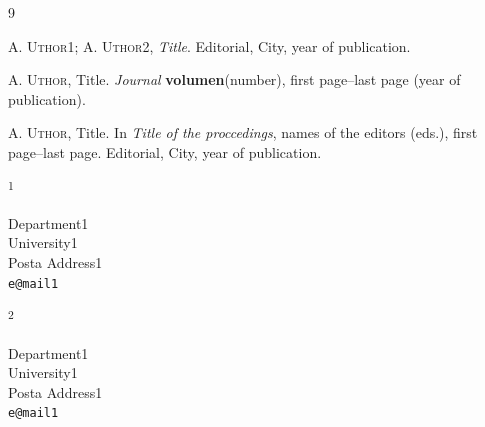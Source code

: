 \documentclass{article}
\newcommand{\ADDRESS}[2]{\noindent
  \textsuperscript{#1}\parbox[t]{0.9\textwidth}{#2} \vspace{6pt}}
\begin{document}

\begin{thebibliography}{9}

   \textsc{A. Uthor1; A. Uthor2}, \emph{Title}.
    Editorial, City, year of publication.

   \textsc{A. Uthor}, Title.
  \emph{Journal} \textbf{volumen}(number), first page--last page  (year of publication).

   \textsc{A. Uthor}, Title.
  In \emph{Title of the proccedings}, names of the editors (eds.),
   first page--last page. Editorial, City, year of publication.

\end{thebibliography}

\vspace{1cm}

\ADDRESS{1}{
Department1  \\University1 \\
Posta Address1 \\
\texttt{e@mail1}
}

\vspace{.5cm}

\ADDRESS{2}{
Department1  \\University1 \\
Posta Address1 \\
\texttt{e@mail1}
}
\end{document}
